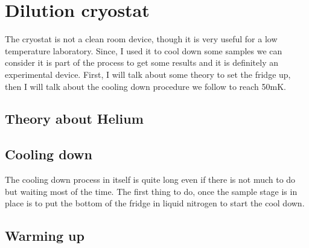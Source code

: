             
            \section{Dilution cryostat}
            
            The cryostat is not a clean room device, though it is very useful for a low temperature laboratory. Since, I used it to cool down some samples we can consider it is part of the process to get some results and it is definitely an experimental device. First, I will talk about some theory to set the fridge up, then I will talk about the cooling down procedure we follow to reach 50mK.
            
            \subsection{Theory about Helium}
            
            
            \subsection{Cooling down}
            The cooling down process in itself is quite long even if there is not much to do but waiting most of the time. The first thing to do, once the sample stage is in place is to put the bottom of the fridge in liquid nitrogen to start the cool down.
            
            
            \subsection{Warming up}
            
            
            

